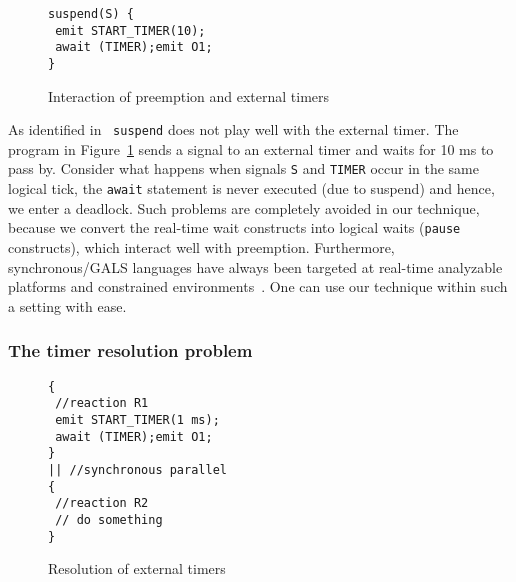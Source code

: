 \begin{figure}[h!]
  \centering
	\vspace{-10pt}
		\begin{lstlisting}[style=sysj,basicstyle=\normalsize\ttfamily,morekeywords={emit,trap,pause,exit,delay,suspend}]
suspend(S) {
 emit START_TIMER(10); 
 await (TIMER);emit O1;
}
		\end{lstlisting}
  \caption{Interaction of preemption and external timers}
  \label{fig:preemp}
	\vspace{-10pt}
\end{figure}

As identified in~\cite{Bourke2009a} \texttt{suspend} does not play well
with the external timer. The program in Figure~\ref{fig:preemp} sends a
signal to an external timer and waits for 10 ms to pass by. Consider
what happens when signals \texttt{S} and \texttt{TIMER} occur in the
same logical tick, the \texttt{await} statement is never executed (due
to suspend) and hence, we enter a deadlock. Such problems are completely
avoided in our technique, because we convert the real-time wait
constructs into logical waits (\texttt{pause} constructs), which
interact well with preemption.  Furthermore, synchronous/GALS languages
have always been targeted at real-time analyzable platforms and
constrained
environments~\cite{DBLP:journals/pieee/SifakisTY03,boldt07}. One can use
our technique within such a setting with ease.

\subsubsection{The timer resolution problem}
\label{sec:resolution-real-time}

\begin{figure}[h!]
  \centering
	\vspace{-10pt}
		\begin{lstlisting}[style=sysj,basicstyle=\normalsize\ttfamily,morekeywords={emit,trap,pause,exit,delay,suspend}]
{
 //reaction R1
 emit START_TIMER(1 ms); 
 await (TIMER);emit O1;
}
|| //synchronous parallel
{
 //reaction R2
 // do something
}
		\end{lstlisting}
  \caption{Resolution of external timers}
  \label{fig:resolution}
	\vspace{-10pt}
\end{figure}

